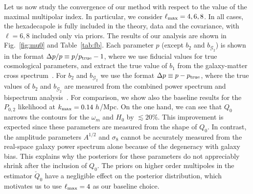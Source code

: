 \documentclass[12pt,a4paper]{article}
\begin{document}
Let us now study the convergence of our method with respect to the value of
the maximal multipolar index. In particular, we consider $\ell_{\rm max}=4,6,8$. 
In all cases, the hexadecapole is fully included in the theory, data and the covariance, with $\ell = 6, 8$ included only via priors.
The results of our analysis are shown in Fig.~\ref{fig:mu0} and Table~\ref{tab:fb}. 
Each parameter $p$ (except $b_2$ and $b_{\mathcal{G}_2}$)
is shown in the format $\Delta p/p\equiv p/p_{\rm true}-1$,
where we use fiducial values for true cosmological parameters, and extract the true value of $b_1$ from the galaxy-matter cross 
spectrum~\cite{Nishimichi:2020tvu}.
For $b_2$ and $b_{\mathcal{G}_2}$ we use the format
$\Delta p \equiv p-p_{\rm true}$, where the true values of $b_2$ and $b_{\mathcal{G}_2}$
are measured from the combined power spectrum and bispectrum
analysis~\cite{Ivanov:2021kcd}.
For comparison, we show also the baseline results for the $P_{0,2}$ likelihood at $k_{\rm max}=0.14~h$/Mpc.
On the one hand, we can see that $Q_0$ narrows the
contours for the $\omega_{m}$ and $H_0$ by $\lesssim 20\%$. 
This improvement is expected since these parameters are measured 
from the shape of $Q_0$.
In contrast, the amplitude parameters $A^{1/2}$
and $\sigma_8$ cannot be accurately measured from the 
real-space galaxy power spectrum alone because of the degeneracy with galaxy bias.
This explains why the posteriors for these parameters do not appreciably shrink 
after the inclusion of $Q_0$.
The priors on higher 
order multipoles in the estimator $\check{Q}_0$ have a negligible effect on the posterior 
distribution, which motivates us to use $\ell_{\rm max}=4$
as our baseline choice.
\end{document}

